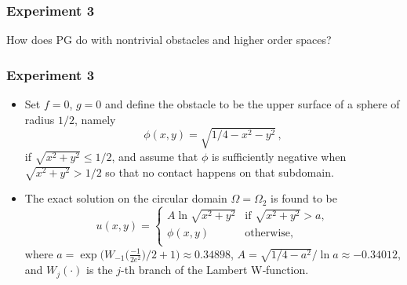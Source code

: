 \documentclass[aspectratio=169,xcolor=dvipsnames,11pt]{beamer}
\begin{document}
\begin{frame}
\begin{figure}
\end{figure}
\end{frame}

\begin{frame}\frametitle{Experiment 3}
\begin{center}
{\color{Maroon} \Large How does PG do with nontrivial obstacles and higher order spaces?}
\end{center}
\end{frame}

\begin{frame}\frametitle{Experiment 3}
\begin{itemize}
\item Set $f = 0$, $g = 0$ and define the obstacle to be the upper surface of a sphere of radius $1/2$, namely
\begin{equation}
\label{eq:SphericalObstacle}
	\phi(x,y) = \sqrt{ 1/4 - x^2 - y^2 }
	\,,
\end{equation}
if $\sqrt{x^2 + y^2} \leq 1/2$, and assume that $\phi$ is sufficiently negative when $\sqrt{x^2 + y^2} > 1/2$ so that no contact happens on that subdomain.
\item The exact solution on the circular domain $\Omega = \Omega_2$ is found to be
\begin{equation}
	u(x,y) =
	\begin{cases}
		A \ln\sqrt{x^2 + y^2} & \text{if~} \sqrt{x^2 + y^2} > a,\\
		\phi(x,y) & \text{otherwise},\\
	\end{cases}
\end{equation}
where $a = \exp\big(W_{-1}\big(\frac{-1}{2e^2}\big)/2 + 1\big) \approx 0.34898$, $A = {\sqrt{1/4 - a^2}}/{\ln a} \approx -0.34012$, and $W_{j}(\cdot)$ is the $j$-th branch of the Lambert W‐function.
\end{itemize}
\end{frame}
\end{document}
